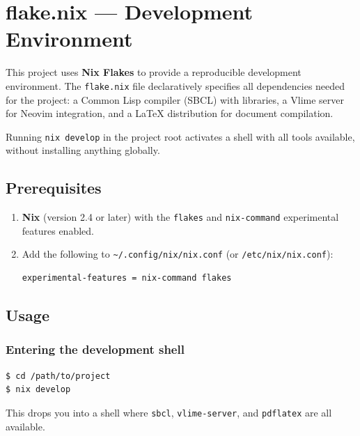 \documentclass[a4paper,11pt]{article}
\newcommand{\key}[1]{\texttt{#1}}
\newcommand{\file}[1]{\texttt{#1}}
\newcommand{\pkg}[1]{\texttt{#1}}
\begin{document}
\newpage
\appendix

\section{flake.nix --- Development Environment}

This project uses \textbf{Nix Flakes} to provide a reproducible development environment.
The \file{flake.nix} file declaratively specifies all dependencies needed for the project:
a Common Lisp compiler (SBCL) with libraries, a Vlime server for Neovim integration,
and a \LaTeX{} distribution for document compilation.

Running \key{nix develop} in the project root activates a shell
with all tools available, without installing anything globally.

\subsection{Prerequisites}

\begin{enumerate}
  \item \textbf{Nix} (version 2.4 or later) with the \texttt{flakes} and
        \texttt{nix-command} experimental features enabled.
  \item Add the following to \file{\textasciitilde/.config/nix/nix.conf}
        (or \file{/etc/nix/nix.conf}):
\begin{lstlisting}[style=shell]
experimental-features = nix-command flakes
\end{lstlisting}
\end{enumerate}

\subsection{Usage}

\subsubsection{Entering the development shell}

\begin{lstlisting}[style=shell]
$ cd /path/to/project
$ nix develop
\end{lstlisting}

This drops you into a shell where \pkg{sbcl}, \pkg{vlime-server},
and \pkg{pdflatex} are all available.
\end{document}
